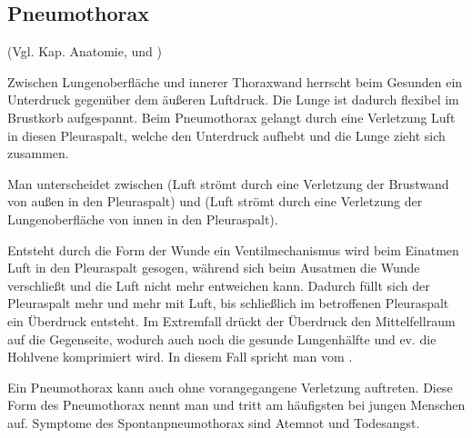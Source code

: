 \subsection{Pneumothorax}\label{topic:pneumothorax}


(Vgl. Kap. Anatomie,  und
)

Zwischen Lungenoberfläche und innerer Thoraxwand herrscht
beim Gesunden ein Unterdruck gegenüber dem äußeren Luftdruck.
Die Lunge ist dadurch flexibel im Brustkorb aufgespannt. Beim
Pneumothorax gelangt durch eine Verletzung Luft in diesen
Pleuraspalt, welche den Unterdruck aufhebt und die Lunge
zieht sich zusammen. 

Man unterscheidet zwischen  (Luft strömt durch eine Verletzung der
Brustwand von außen in den Pleuraspalt) und
 (Luft strömt durch eine
Verletzung der Lungenoberfläche von innen in den
Pleuraspalt). 

Entsteht durch die Form der Wunde ein
Ventilmechanismus wird beim Einatmen Luft in den Pleuraspalt
gesogen, während sich beim Ausatmen die Wunde verschließt und
die Luft nicht mehr entweichen kann. Dadurch füllt sich der
Pleuraspalt mehr und mehr mit Luft, bis schließlich im
betroffenen Pleuraspalt ein Überdruck entsteht. Im Extremfall
drückt der Überdruck den Mittelfellraum auf die Gegenseite,
wodurch auch noch die gesunde Lungenhälfte und ev. die
Hohlvene komprimiert wird. In diesem Fall spricht man vom
.

Ein Pneumothorax kann auch ohne vorangegangene Verletzung auftreten. Diese Form
des Pneumothorax nennt man  und tritt am häufigsten bei
jungen Menschen auf. Symptome des Spontanpneumothorax sind Atemnot und
Todesangst.



